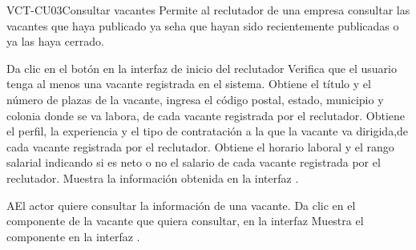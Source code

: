 \clearpage
\begin{UseCase}[]{VCT-CU03}{Consultar vacantes}{
	Permite al reclutador de una empresa  consultar las vacantes que haya publicado ya seha que hayan sido recientemente publicadas 
	o ya las haya cerrado.
	}
\end{UseCase}

\begin{UCtrayectoria}
	\UCpaso [\UCactor] Da clic en el botón  en la interfaz de inicio del reclutador
	\UCpaso [\UCsist] Verifica que el usuario tenga al menos una vacante registrada en el sistema.
	\UCpaso [\UCsist] Obtiene el título y el número de plazas de la vacante, ingresa el código postal, estado, municipio y colonia donde 
	se va labora, de cada vacante registrada por el reclutador.
	\UCpaso [\UCsist] Obtiene el perfil, la experiencia y el tipo de contratación a la que la vacante va dirigida,de cada vacante registrada por el reclutador.
	\UCpaso [\UCsist] Obtiene el horario laboral y el rango salarial indicando si es neto o no el salario de cada vacante registrada por el reclutador.
	\UCpaso [\UCsist] Muestra la información obtenida en la interfaz . 
\end{UCtrayectoria}

\begin{UCtrayectoriaA}{A}{El actor quiere consultar la información de una vacante.}
	\UCpaso [\UCactor] Da clic en el componente  de la vacante que quiera consultar, en la interfaz  
	\UCpaso [\UCsist] Muestra el componente  en la interfaz .
\end{UCtrayectoriaA} 